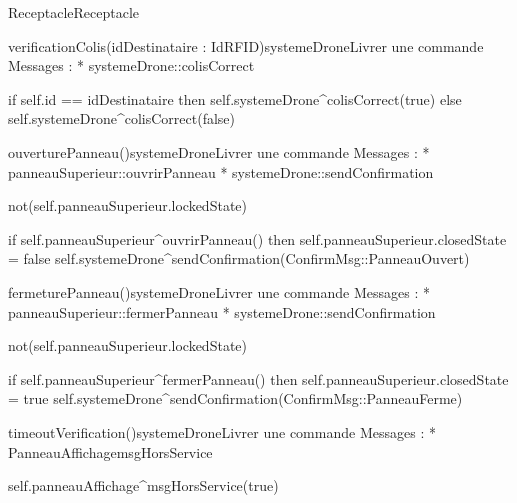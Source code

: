 \begin{OM}{Receptacle}{Receptacle}
\begin{OMOperation}{verificationColis(idDestinataire : IdRFID)}{systemeDrone}{Livrer une commande}
Messages :
* systemeDrone::{colisCorrect}
\begin{OMPre}
\end{OMPre}
\begin{OMPost}
        if self.id == idDestinataire then
                self.systemeDrone^colisCorrect(true)
        else
                self.systemeDrone^colisCorrect(false)
            \end{OMPost}
\end{OMOperation}

\begin{OMOperation}{ouverturePanneau()}{systemeDrone}{Livrer une commande}
Messages :
* panneauSuperieur::{ouvrirPanneau}
* systemeDrone::{sendConfirmation}
\begin{OMPre}
not(self.panneauSuperieur.lockedState)
\end{OMPre}
\begin{OMPost}
        if self.panneauSuperieur^ouvrirPanneau() then
                self.panneauSuperieur.closedState = false
                self.systemeDrone^sendConfirmation(ConfirmMsg::PanneauOuvert)
            \end{OMPost}
\end{OMOperation}

\begin{OMOperation}{fermeturePanneau()}{systemeDrone}{Livrer une commande}
Messages :
* panneauSuperieur::{fermerPanneau}
* systemeDrone::{sendConfirmation}
\begin{OMPre}
 not(self.panneauSuperieur.lockedState)
\end{OMPre}
\begin{OMPost}
        if self.panneauSuperieur^fermerPanneau() then
                self.panneauSuperieur.closedState = true
                self.systemeDrone^sendConfirmation(ConfirmMsg::PanneauFerme)
            \end{OMPost}
\end{OMOperation}

\begin{OMOperation}{timeoutVerification()}{systemeDrone}{Livrer une commande}
Messages :
* PanneauAffichage{msgHorsService}
\begin{OMPre}
\end{OMPre}
\begin{OMPost}
        self.panneauAffichage^msgHorsService(true)
    \end{OMPost}
\end{OMOperation}


\end{OM}
